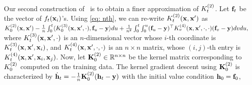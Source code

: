 Our second construction of \lantk~is to obtain a finer approximation of ${K}^{(2)}_t$. Let ${\mathbf{f}}_t$ be the vector of $f_t({\mathbf{x}}_i)$'s. Using \eqref{eq: nth}, we can re-write 
${K}^{(2)}_t({\mathbf{x}}, {\mathbf{x}}')$ as ${K}^{(2)}_0({\mathbf{x}}, {\mathbf{x}}') -\frac{1}{n} \int_{0}^t \langle {K}^{(3)}_0({\mathbf{x}}, {\mathbf{x}}', \cdot), {\mathbf{f}}_u-{\mathbf{y}} \rangle du + \frac{1}{n^2} \int_0^t \int_0^u ({\mathbf{f}}_u - {\mathbf{y}})^\top {K}^{(4)}_v({\mathbf{x}}, {\mathbf{x}}', \cdot, \cdot) ({\mathbf{f}}_v - {\mathbf{y}}) dvdu,$
where ${K}^{(3)}_t({\mathbf{x}},{\mathbf{x}}', \cdot)$ is an $n$-dimensional vector whose $i$-th coordinate is ${K}^{(3)}_t({\mathbf{x}},{\mathbf{x}}', {\mathbf{x}}_i)$, and ${K}^{(4)}_t({\mathbf{x}},{\mathbf{x}}', \cdot,\cdot)$ is an $n\times n$ matrix, whose $(i, j)$-th entry is ${K}^{(4)}_t({\mathbf{x}},{\mathbf{x}}', {\mathbf{x}}_i, {\mathbf{x}}_j)$.
Now, let ${{\mathbf{K}}}^{(2)}_0 \in \mathbb{R}^{n\times n}$ be the kernel matrix corresponding to ${K}^{(2)}_0$ computed on the training data. The kernel gradient descent using ${{\mathbf{K}}}^{(2)}_0$ is characterized by $\dot{{\mathbf{h}}}_t = -\frac{1}{n} {{\mathbf{K}}}^{(2)}_0({\mathbf{h}}_t - {\mathbf{y}})$ with the initial value condition ${\mathbf{h}}_0 = {\mathbf{f}}_0$,
